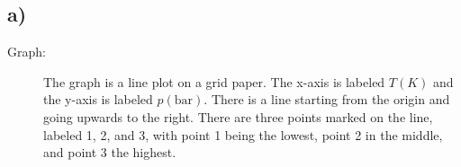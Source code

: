 

\subsection*{a)}
\begin{description}
    \item[Graph:] The graph is a line plot on a grid paper. The x-axis is labeled $T(K)$ and the y-axis is labeled $p(\text{bar})$. There is a line starting from the origin and going upwards to the right. There are three points marked on the line, labeled 1, 2, and 3, with point 1 being the lowest, point 2 in the middle, and point 3 the highest.
\end{description}